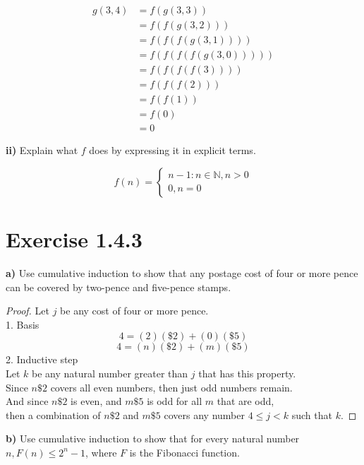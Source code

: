 \documentclass[titlepage, letterpaper, fleqn]{article}
\newcommand{\spacepls}{\vspace{5mm}}
\begin{document}
\begin{align*}
g(3,4) & = f(g(3,3)) \\
& = f(f(g(3,2)))\\
& = f(f(f(g(3,1))))\\
& = f(f(f(f(g(3,0)))))\\
& = f(f(f(f(3))))\\
& = f(f(f(2)))\\
& = f(f(1))\\
& = f(0)\\
& = 0
\end{align*}
\spacepls

\textbf{ii)} Explain what \(f\) does by expressing it in explicit terms.

\[f(n) =
\begin{cases}
n - 1 \colon n \in \mathbb{N}, n > 0\\
0, n = 0
\end{cases}
\]

\section{Exercise 1.4.3}

{\large \textbf{a)} Use cumulative induction to show that any postage cost of four or more pence can be covered by two-pence and five-pence stamps.}

\begin{proof}
Let \(j\) be any cost of four or more pence.\\
1. Basis\\
\[4 = (2)(\$2) + (0)(\$5)\]
\[4 = (n)(\$2) + (m)(\$5)\]
2. Inductive step\\
Let \(k\) be any natural number greater than \(j\) that has this property.\\
Since \(n\$2\) covers all even numbers, then just odd numbers remain.\\
And since \(n\$2\) is even, and \(m\$5\) is odd for all \(m\) that are odd,\\
then a combination of \(n\$2\) and \(m\$5\) covers any number \(4 \leq j < k\) such that \(k\).
\end{proof}

\pagebreak

{\large \textbf{b)} Use cumulative induction to show that for every natural number \(n, F(n) \leq 2^n - 1\), where \(F\) is the Fibonacci function.}
\end{document}
